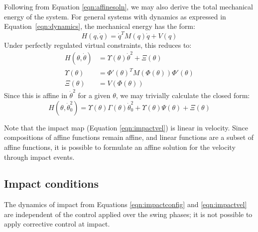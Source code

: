 Following from Equation \ref{eqn:affinesoln}, we may also derive the total mechanical energy of the system. For general systems with dynamics as expressed in Equation~\ref{eqn:dynamics}, the mechanical energy has the form:
\[ H\left(q,\dot{q}\right) = \dot{q}^TM(q)\dot{q} + V(q) \]
Under perfectly regulated virtual constraints, this reduces to:
\begin{align*}
	H\left(\theta,\dot{\theta}\right) &= \Upsilon(\theta)\dot{\theta}^2+\Xi(\theta) \\
	\Upsilon(\theta) &= \Phi'(\theta)^TM\left(\Phi(\theta)\right)\Phi'(\theta) \\
	\Xi(\theta) &= V\left(\Phi(\theta)\right)
\end{align*}
Since this is affine in $\dot{\theta}^2$ for a given $\theta$, we may trivially calculate the closed form:
\begin{equation}
	H\left(\theta, \dot{\theta}_0^2\right) =
	\Upsilon(\theta)\Gamma\left(\theta\right)\dot{\theta}_0^2 +
	\Upsilon(\theta)\Psi\left(\theta\right) + \Xi(\theta)
\end{equation}

Note that the impact map (Equation \ref{eqn:impactvel}) is linear in velocity. Since compositions of affine functions remain affine, and linear functions are a subset of affine functions, it is possible to formulate an affine solution for the velocity through impact events.

\subsection{Impact conditions} \label{sec:impact}
The dynamics of impact from Equations \ref{eqn:impactconfig} and \ref{eqn:impactvel} are independent of the control applied over the swing phases; it is not possible to apply corrective control at impact.

